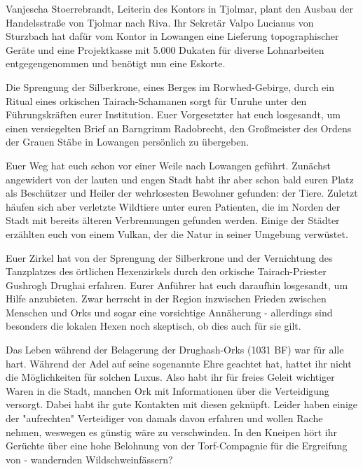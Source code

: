 Vanjescha Stoerrebrandt, Leiterin des Kontors in Tjolmar, plant den Ausbau der Handelsstraße von Tjolmar nach Riva. Ihr Sekretär Valpo Lucianus von Sturzbach hat dafür vom Kontor in Lowangen eine Lieferung topographischer Geräte und eine Projektkasse mit 5.000 Dukaten für diverse Lohnarbeiten entgegengenommen und benötigt nun eine Eskorte.

Die Sprengung der Silberkrone, eines Berges im Rorwhed-Gebirge, durch ein Ritual eines orkischen Tairach-Schamanen sorgt für Unruhe unter den Führungskräften eurer Institution. Euer Vorgesetzter hat euch losgesandt, um einen versiegelten Brief an Barngrimm Radobrecht, den Großmeister des Ordens der Grauen Stäbe in Lowangen persönlich zu übergeben.

Euer Weg hat euch schon vor einer Weile nach Lowangen geführt. Zunächst angewidert von der lauten und engen Stadt habt ihr aber schon bald euren Platz als Beschützer und Heiler der wehrlosesten Bewohner gefunden: der Tiere. Zuletzt häufen sich aber verletzte Wildtiere unter euren Patienten, die im Norden der Stadt mit bereits älteren Verbrennungen gefunden werden. Einige der Städter erzählten euch von einem Vulkan, der die Natur in seiner Umgebung verwüstet.


Euer Zirkel hat von der Sprengung der Silberkrone und der Vernichtung des Tanzplatzes des örtlichen Hexenzirkels durch den orkische Tairach-Priester Gushrogh Drughai erfahren. Eurer Anführer hat euch daraufhin losgesandt, um Hilfe anzubieten. Zwar herrscht in der Region inzwischen Frieden zwischen Menschen und Orks und sogar eine vorsichtige Annäherung - allerdings sind besonders die lokalen Hexen noch skeptisch, ob dies auch für sie gilt.

Das Leben während der Belagerung der Drughash-Orks (1031 BF) war für alle hart. Während der Adel auf seine sogenannte Ehre geachtet hat, hattet ihr nicht die Möglichkeiten für solchen Luxus. Also habt ihr für freies Geleit wichtiger Waren in die Stadt, manchen Ork mit Informationen über die Verteidigung versorgt. Dabei habt ihr gute Kontakten mit diesen geknüpft. Leider haben einige der "aufrechten" Verteidiger von damals davon erfahren und wollen Rache nehmen, weswegen es günstig wäre zu verschwinden. In den Kneipen hört ihr Gerüchte über eine hohe Belohnung von der Torf-Compagnie für die Ergreifung von - wandernden Wildschweinfässern?

